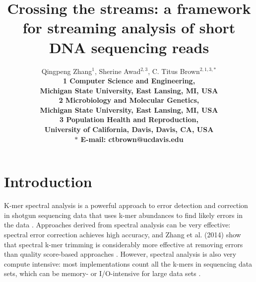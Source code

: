 \documentclass{article}
\begin{document}
\title{Crossing the streams: a framework for streaming analysis of
short DNA sequencing reads}

\author{Qingpeng Zhang$^{1}$, Sherine Awad$^{2,3}$, C. Titus Brown$^{2,1,3,\ast}$\\
\small
\bf{1} Computer Science and Engineering,\\
\small
Michigan State University,
East Lansing, MI, USA
\\
\small
\bf{2} Microbiology and Molecular Genetics,\\
\small
Michigan State University,
East Lansing, MI, USA
\\
\small
\bf{3} Population Health and Reproduction,\\
\small
University of California, Davis, Davis, CA, USA
\\
\small
$\ast$ E-mail: ctbrown@ucdavis.edu
}
\maketitle



\section{Introduction}

K-mer spectral analysis is a powerful approach to error detection and
correction in shotgun sequencing data that uses k-mer abundances to
find likely errors in the data \cite{Pevzner2001}.  Approaches derived
from spectral analysis can be very effective: spectral error
correction achieves high accuracy, and Zhang et al. (2014) show that
spectral k-mer trimming is considerably more effective at removing
errors than quality score-based approaches
\cite{quake,Zhang2014}.  However, spectral analysis is also very
compute intensive: most implementations count all the k-mers in
sequencing data sets, which can be memory- or I/O-intensive for large
data sets \cite{Zhang2014}.
\end{document}
